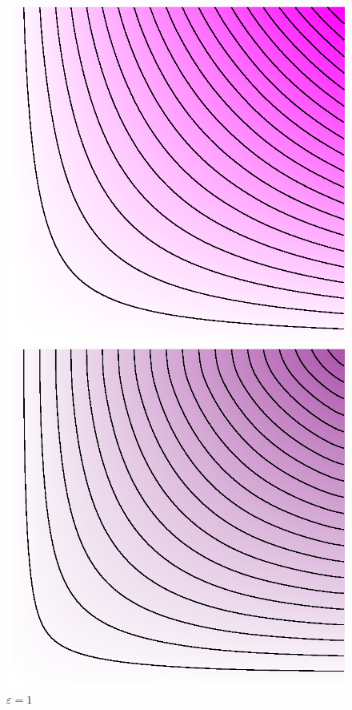 \documentclass[cn,10pt,math=newtx,citestyle=gb7714-2015,bibstyle=gb7714-2015]{elegantbook}
\begin{document}
\begin{figure}[H]
\begin{minipage}{0.8\linewidth}
	\begin{minipage}{0.19\linewidth}
		\centering
		\begin{mdframed}
		    \includegraphics[width=\linewidth]{figure/fig4.4/evol-copula-1.eps}
		\end{mdframed}
		\caption*{$\varepsilon = 1$}
	\end{minipage}
	\begin{minipage}{0.19\linewidth}
		\centering
		\begin{mdframed}
		    \includegraphics[width=\linewidth]{figure/fig4.4/evol-copula-17.eps}

\end{mdframed}
\end{minipage}
\end{minipage}
\end{figure}
\end{document}
